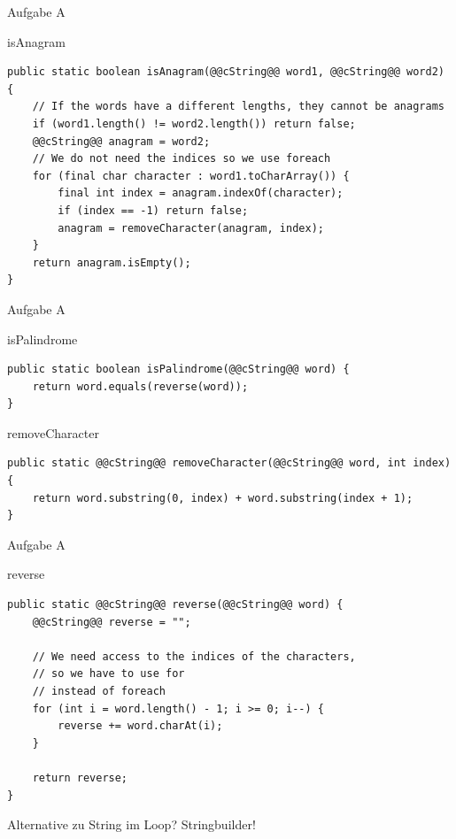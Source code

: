 \documentclass[aspectratio=169]{beamer}
\begin{document}
\begin{frame}[fragile]{Aufgabe A}
  \begin{block}{isAnagram}
    \begin{lstlisting}
public static boolean isAnagram(@@cString@@ word1, @@cString@@ word2) {
    // If the words have a different lengths, they cannot be anagrams
    if (word1.length() != word2.length()) return false;
    @@cString@@ anagram = word2;
    // We do not need the indices so we use foreach
    for (final char character : word1.toCharArray()) {
        final int index = anagram.indexOf(character);
        if (index == -1) return false;
        anagram = removeCharacter(anagram, index);
    }
    return anagram.isEmpty();
}
    \end{lstlisting}
  \end{block}
\end{frame}

\begin{frame}[fragile]{Aufgabe A}
  \begin{block}{isPalindrome}
    \begin{lstlisting}
public static boolean isPalindrome(@@cString@@ word) {
    return word.equals(reverse(word));
}
    \end{lstlisting}
  \end{block}
  \pause
  \begin{block}{removeCharacter}
    \begin{lstlisting}
public static @@cString@@ removeCharacter(@@cString@@ word, int index) {
    return word.substring(0, index) + word.substring(index + 1);
}
    \end{lstlisting}
  \end{block}
\end{frame}

\begin{frame}[fragile]{Aufgabe A}
  \begin{block}{reverse}
    \begin{lstlisting}
public static @@cString@@ reverse(@@cString@@ word) {
    @@cString@@ reverse = "";

    // We need access to the indices of the characters,
    // so we have to use for
    // instead of foreach
    for (int i = word.length() - 1; i >= 0; i--) {
        reverse += word.charAt(i);
    }

    return reverse;
}
    \end{lstlisting}
  \end{block}
  \pause
  Alternative zu \color{classcolor}String \color{FGround} im Loop? \pause \color{classcolor}Stringbuilder\color{FGround}!
\end{frame}
\end{document}

